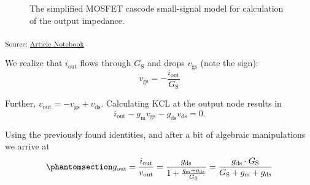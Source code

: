 \documentclass[
  a4paper,
  DIV=11,
  numbers=noendperiod]{scrartcl}
\begin{document}
\begin{figure}[H]


\caption{\label{fig-cascode-small-signal-simplified-out}The simplified
MOSFET cascode small-signal model for calculation of the output
impedance.}

\end{figure}%

\textsubscript{Source:
\href{https://iic-jku.github.io/analog-circuit-design/index.qmd.html}{Article
Notebook}}

We realize that \(i_\mathrm{out}\) flows through \(G_\mathrm{S}\) and
drops \(v_\mathrm{gs}\) (note the sign): \[
v_\mathrm{gs}= -\frac{i_\mathrm{out}}{G_\mathrm{S}}
\]

Further, \(v_\mathrm{out} = -v_\mathrm{gs}+ v_\mathrm{ds}\). Calculating
KCL at the output node results in \[
i_\mathrm{out} - g_\mathrm{m}v_\mathrm{gs}- g_\mathrm{ds}v_\mathrm{ds}= 0.
\]

Using the previously found identities, and after a bit of algebraic
manipulations we arrive at
\begin{equation}\phantomsection\label{eq-cascode-output}{
g_\mathrm{out} = \frac{i_\mathrm{out}}{v_\mathrm{out}} = \frac{g_\mathrm{ds}}{1 + \frac{g_\mathrm{m}+ g_\mathrm{ds}}{G_\mathrm{S}}} = \frac{g_\mathrm{ds}\cdot G_\mathrm{S}}{G_\mathrm{S} + g_\mathrm{m}+ g_\mathrm{ds}}
}\end{equation}
\end{document}
